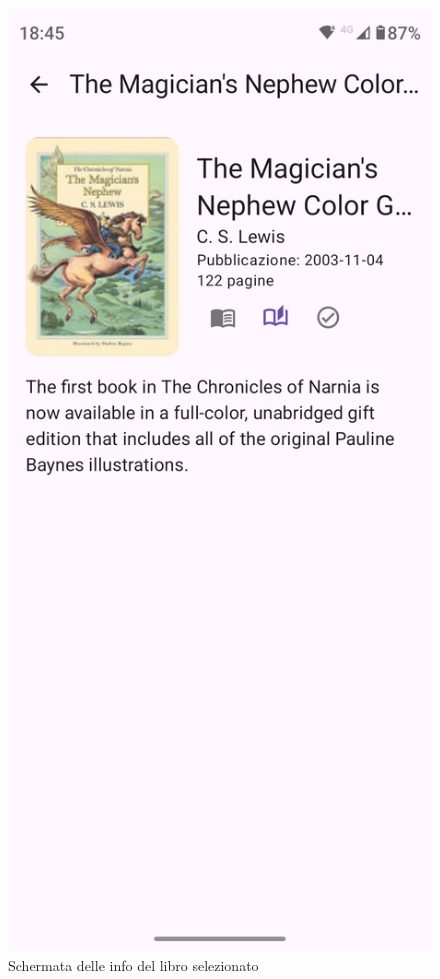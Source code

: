 \documentclass{article}
\begin{document}
\begin{figure}[H]
  \centering
  \includegraphics[width=0.6\linewidth]{book-detail.png}
  \caption{Schermata delle info del libro selezionato}
  \label{fig:sitemap}
\end{figure}
\end{document}
